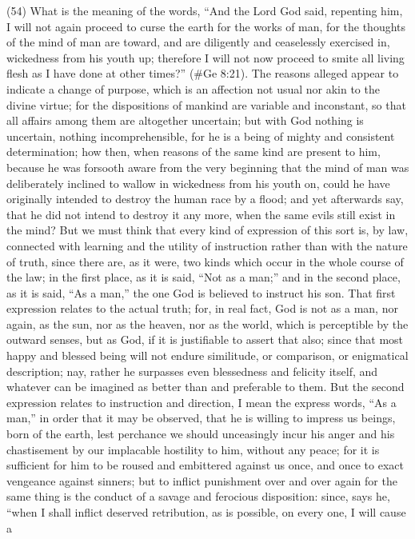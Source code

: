 (54) What is the meaning of the words, ``And the Lord God said, repenting him, I will not again
proceed to curse the earth for the works of man, for the thoughts of the mind of man are toward,
and are diligently and ceaselessly exercised in, wickedness from his youth up; therefore I will not
now proceed to smite all living flesh as I have done at other times?'' (\#Ge 8:21). The reasons
alleged appear to indicate a change of purpose, which is an affection not usual nor akin to the
divine virtue; for the dispositions of mankind are variable and inconstant, so that all affairs among
them are altogether uncertain; but with God nothing is uncertain, nothing incomprehensible, for he
is a being of mighty and consistent determination; how then, when reasons of the same kind are
present to him, because he was forsooth aware from the very beginning that the mind of man was
deliberately inclined to wallow in wickedness from his youth on, could he have originally intended to
destroy the human race by a flood; and yet afterwards say, that he did not intend to destroy it any
more, when the same evils still exist in the mind? But we must think that every kind of expression of
this sort is, by law, connected with learning and the utility of instruction rather than with the nature of
truth, since there are, as it were, two kinds which occur in the whole course of the law; in the first
place, as it is said, ``Not as a man;'' and in the second place, as it is said, ``As a man,'' the one God
is believed to instruct his son. That first expression relates to the actual truth; for, in real fact, God
is not as a man, nor again, as the sun, nor as the heaven, nor as the world, which is perceptible by
the outward senses, but as God, if it is justifiable to assert that also; since that most happy and
blessed being will not endure similitude, or comparison, or enigmatical description; nay, rather he
surpasses even blessedness and felicity itself, and whatever can be imagined as better than and
preferable to them. But the second expression relates to instruction and direction, I mean the
express words, ``As a man,'' in order that it may be observed, that he is willing to impress us beings,
born of the earth, lest perchance we should unceasingly incur his anger and his chastisement by
our implacable hostility to him, without any peace; for it is sufficient for him to be roused and
embittered against us once, and once to exact vengeance against sinners; but to inflict punishment
over and over again for the same thing is the conduct of a savage and ferocious disposition:
since, says he, ``when I shall inflict deserved retribution, as is possible, on every one, I will cause a
